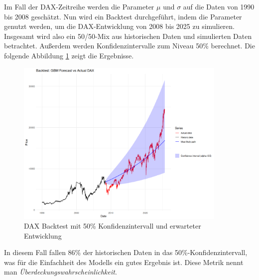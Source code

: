 \begin{bsp}
Im Fall der DAX-Zeitreihe werden die Parameter $\mu$ und $\sigma$ auf die Daten von 1990 bis 2008 geschätzt.
Nun wird ein Backtest durchgeführt, indem die Parameter genutzt werden, um die DAX-Entwicklung von 2008 bis 2025 zu simulieren. Insgesamt 
wird also ein 50/50-Mix aus historischen Daten und simulierten Daten betrachtet. Außerdem 
werden Konfidenzintervalle zum Niveau 50\% berechnet. Die folgende Abbildung
\ref{fig:dax_backtest} zeigt die Ergebnisse.

\begin{figure}[H]
    \centering
    \includegraphics[width=0.9\textwidth]{images/dax_backtest.png}
    \caption{DAX Backtest mit 50\% Konfidenzintervall und erwarteter Entwicklung}
    \label{fig:dax_backtest}
\end{figure}

In diesem Fall fallen 86\% der historischen Daten in das 50\%-Konfidenzintervall,
was für die Einfachheit des Modells ein gutes Ergebnis ist. Diese Metrik nennt 
man \textit{Überdeckungswahrscheinlichkeit}.

\end{bsp}

